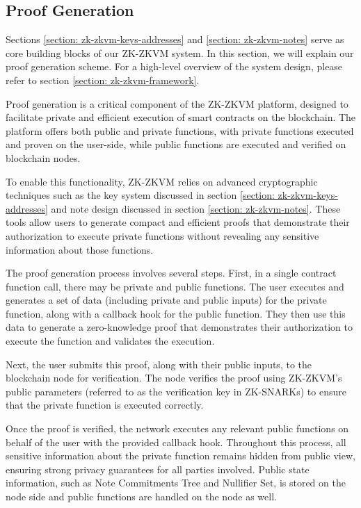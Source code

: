 \subsection{Proof Generation}\label{section: zk-zkvm-user-end-prove}

Sections \ref{section: zk-zkvm-keys-addresses} and \ref{section: zk-zkvm-notes} serve as core building blocks of our ZK-ZKVM system. In this section, we will explain our proof generation scheme. For a high-level overview of the system design, please refer to section \ref{section: zk-zkvm-framework}.

Proof generation is a critical component of the ZK-ZKVM platform, designed to facilitate private and efficient execution of smart contracts on the blockchain. The platform offers both public and private functions, with private functions executed and proven on the user-side, while public functions are executed and verified on blockchain nodes.

To enable this functionality, ZK-ZKVM relies on advanced cryptographic techniques such as the key system discussed in section \ref{section: zk-zkvm-keys-addresses} and note design discussed in section \ref{section: zk-zkvm-notes}. These tools allow users to generate compact and efficient proofs that demonstrate their authorization to execute private functions without revealing any sensitive information about those functions.

The proof generation process involves several steps. First, in a single contract function call, there may be private and public functions. The user executes and generates a set of data (including private and public inputs) for the private function, along with a callback hook for the public function. They then use this data to generate a zero-knowledge proof that demonstrates their authorization to execute the function and validates the execution.

Next, the user submits this proof, along with their public inputs, to the blockchain node for verification. The node verifies the proof using ZK-ZKVM's public parameters (referred to as the verification key in ZK-SNARKs) to ensure that the private function is executed correctly.

Once the proof is verified, the network executes any relevant public functions on behalf of the user with the provided callback hook. Throughout this process, all sensitive information about the private function remains hidden from public view, ensuring strong privacy guarantees for all parties involved. Public state information, such as Note Commitments Tree and Nullifier Set, is stored on the node side and public functions are handled on the node as well.

